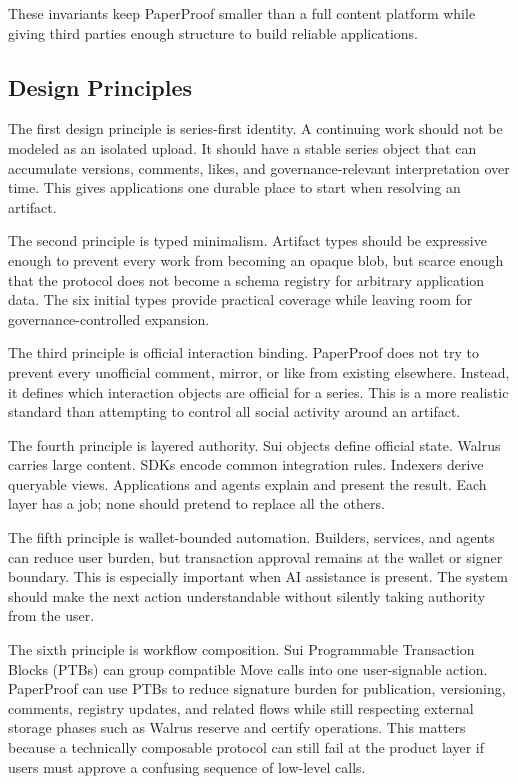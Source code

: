 \documentclass[journal]{IEEEtran}
\begin{document}
These invariants keep PaperProof smaller than a full content platform while giving third parties enough structure to build reliable applications.

\subsection{Design Principles}

The first design principle is series-first identity. A continuing work should not be modeled as an isolated upload. It should have a stable series object that can accumulate versions, comments, likes, and governance-relevant interpretation over time. This gives applications one durable place to start when resolving an artifact.

The second principle is typed minimalism. Artifact types should be expressive enough to prevent every work from becoming an opaque blob, but scarce enough that the protocol does not become a schema registry for arbitrary application data. The six initial types provide practical coverage while leaving room for governance-controlled expansion.

The third principle is official interaction binding. PaperProof does not try to prevent every unofficial comment, mirror, or like from existing elsewhere. Instead, it defines which interaction objects are official for a series. This is a more realistic standard than attempting to control all social activity around an artifact.

The fourth principle is layered authority. Sui objects define official state. Walrus carries large content. SDKs encode common integration rules. Indexers derive queryable views. Applications and agents explain and present the result. Each layer has a job; none should pretend to replace all the others.

The fifth principle is wallet-bounded automation. Builders, services, and agents can reduce user burden, but transaction approval remains at the wallet or signer boundary. This is especially important when AI assistance is present. The system should make the next action understandable without silently taking authority from the user.

The sixth principle is workflow composition. Sui Programmable Transaction Blocks (PTBs) can group compatible Move calls into one user-signable action. PaperProof can use PTBs to reduce signature burden for publication, versioning, comments, registry updates, and related flows while still respecting external storage phases such as Walrus reserve and certify operations. This matters because a technically composable protocol can still fail at the product layer if users must approve a confusing sequence of low-level calls.
\end{document}
